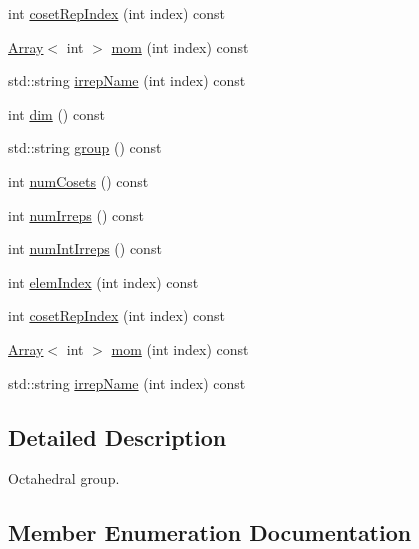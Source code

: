 \begin{DoxyCompactItemize}
\item 
int \mbox{\hyperlink{structHadron_1_1OctGroup_aeaabc93ad3df1b585bc1009b0bf4f5ba}{coset\+Rep\+Index}} (int index) const
\item 
\mbox{\hyperlink{classXMLArray_1_1Array}{Array}}$<$ int $>$ \mbox{\hyperlink{structHadron_1_1OctGroup_ab3c3d81d578cac614b1ccdd456f8ea59}{mom}} (int index) const
\item 
std\+::string \mbox{\hyperlink{structHadron_1_1OctGroup_a58f84ff32d1dce2277f3b9da9d35d594}{irrep\+Name}} (int index) const
\item 
int \mbox{\hyperlink{structHadron_1_1OctGroup_a1db49add38b9263bfd536b3da0cc1566}{dim}} () const
\item 
std\+::string \mbox{\hyperlink{structHadron_1_1OctGroup_a0d21b9bbc5cc2cafa4945e9dd5608a6b}{group}} () const
\item 
int \mbox{\hyperlink{structHadron_1_1OctGroup_a85ea73ed466c052783d454b14d5b30bc}{num\+Cosets}} () const
\item 
int \mbox{\hyperlink{structHadron_1_1OctGroup_aed56aa6c4ed7e2a82048b478c916b9d2}{num\+Irreps}} () const
\item 
int \mbox{\hyperlink{structHadron_1_1OctGroup_abc0b88d4a62fb81c996b6638827cc187}{num\+Int\+Irreps}} () const
\item 
int \mbox{\hyperlink{structHadron_1_1OctGroup_a1410a74894e1d12337548245c4e6fd47}{elem\+Index}} (int index) const
\item 
int \mbox{\hyperlink{structHadron_1_1OctGroup_aeaabc93ad3df1b585bc1009b0bf4f5ba}{coset\+Rep\+Index}} (int index) const
\item 
\mbox{\hyperlink{classXMLArray_1_1Array}{Array}}$<$ int $>$ \mbox{\hyperlink{structHadron_1_1OctGroup_ab3c3d81d578cac614b1ccdd456f8ea59}{mom}} (int index) const
\item 
std\+::string \mbox{\hyperlink{structHadron_1_1OctGroup_a58f84ff32d1dce2277f3b9da9d35d594}{irrep\+Name}} (int index) const
\end{DoxyCompactItemize}


\subsection{Detailed Description}
Octahedral group. 

\subsection{Member Enumeration Documentation}
\mbox{\label{structHadron_1_1OctGroup_a545f26a6b3e87fcbd91a5f2557e79b1f}} 
